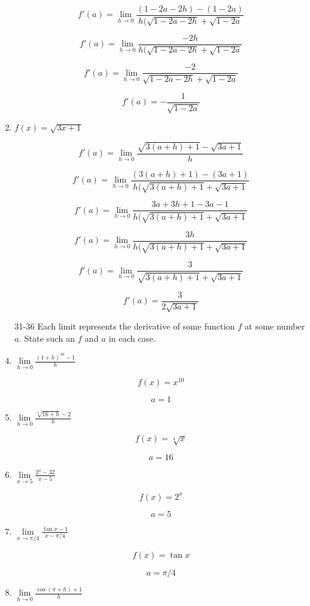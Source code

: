 \documentclass{article}
\begin{document}
\begin{enumerate}
			$$f'(a) = \lim \limits _{h \to 0} \frac{(1-2a-2h) - (1-2a)}{h(\sqrt{1-2a-2h} + \sqrt{1-2a}}$$

			$$f'(a) = \lim \limits _{h \to 0} \frac{-2h}{h(\sqrt{1-2a-2h} + \sqrt{1-2a}}$$

			$$f'(a) = \lim \limits _{h \to 0} \frac{-2}{\sqrt{1-2a-2h} + \sqrt{1-2a}}$$

			$$f'(a) = - \frac{1}{\sqrt{1-2a}}$$

		\item $f(x) = \sqrt{3x+1}$

			$$f'(a) = \lim \limits _{h \to 0} \frac{\sqrt{3(a+h)+1} - \sqrt{3a+1}}{h}$$

			$$f'(a) = \lim \limits _{h \to 0} \frac{(3(a+h)+1) - (3a+1)}{h(\sqrt{3(a+h)+1} + \sqrt{3a+1}}$$

			$$f'(a) = \lim \limits _{h \to 0} \frac{3a + 3h  + 1 - 3a - 1}{h(\sqrt{3(a+h)+1}+\sqrt{3a+1}}$$

			$$f'(a) = \lim \limits _{h \to 0} \frac{3h}{h(\sqrt{3(a+h)+1} + \sqrt{3a+1}}$$

			$$f'(a) = \lim \limits _{h \to 0} \frac{3}{\sqrt{3(a+h)+1} + \sqrt{3a+1}}$$

			$$f'(a) = \frac{3}{2\sqrt{3a+1}}$$

		\item[31-36] Each limit represents the derivative of some function $f$ at some number $a$. State
				such an $f$ and $a$ in each case.

		\item $\lim \limits _{h \to 0} \frac{(1+h)^{10} - 1}{h}$

			$$f(x) = x^{10}$$

			$$a = 1$$

		\item $\lim \limits _{h \to 0} \frac{\sqrt[4]{16+h} - 2}{h}$

			$$f(x) = \sqrt[4]{x}$$

			$$a = 16$$

		\item $\lim \limits _{x \to 5} \frac{2^x - 32}{x-5}$

			$$f(x) = 2^x$$

			$$a = 5$$

		\item $\lim \limits _{x \to \pi/4} \frac{\tan x - 1}{x - \pi/4}$

			$$f(x) = \tan x$$

			$$a = \pi/4$$

		\item $\lim \limits _{h \to 0} \frac{ \cos (\pi + h) + 1}{h}$


\end{enumerate}
\end{document}
